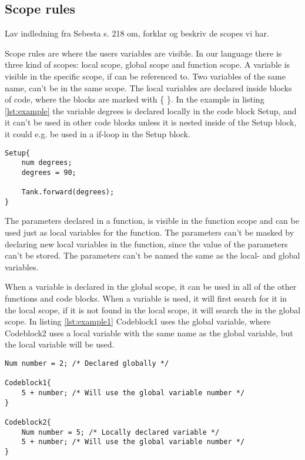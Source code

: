 \subsection{Scope rules}
Lav indledning fra Sebesta s. 218 om, forklar og beskriv de scopes vi har. 

Scope rules are where the users variables are visible. In our language there is three kind of scopes: local scope, global scope and function scope. A variable is visible in the specific scope, if can be referenced to. Two variables of the same name, can't be in the same scope. The local variables are declared inside blocks of code, where the blocks are marked with \{ \}. In the example in listing \ref{lst:example} the variable degrees is declared locally in the code block Setup, and it can't be used in other code blocks unless it is nested inside of the Setup block, it could e.g. be used in a if-loop in the Setup block. 

\begin{lstlisting}[caption={Example of local scoping rules},  xleftmargin=.2\textwidth, label={lst:example}]
Setup{
	num degrees;
	degrees = 90;
	
	Tank.forward(degrees);
}
\end{lstlisting}

The parameters declared in a function, is visible in the function scope and can be used just as local variables for the function. The parameters can't be masked by declaring new local variables in the function, since the value of the parameters can't be stored. The parameters can't be named the same as the local- and global variables. 

When a variable is declared in the global scope, it can be used in all of the other functions and code blocks. When a variable is used, it will first search for it in the local scope, if it is not found in the local scope, it will search the in the global scope. In listing \ref{lst:example1} Codeblock1 uses the global variable, where Codeblock2 uses a local variable with the same name as the global variable, but the local variable will be used.

\begin{lstlisting}[caption={Example of global scoping rules},  xleftmargin=.2\textwidth, label={lst:example1}]
Num number = 2; /* Declared globally */

Codeblock1{
	5 + number; /* Will use the global variable number */
}

Codeblock2{
	Num number = 5; /* Locally declared variable */
	5 + number; /* Will use the global variable number */
}
\end{lstlisting}
